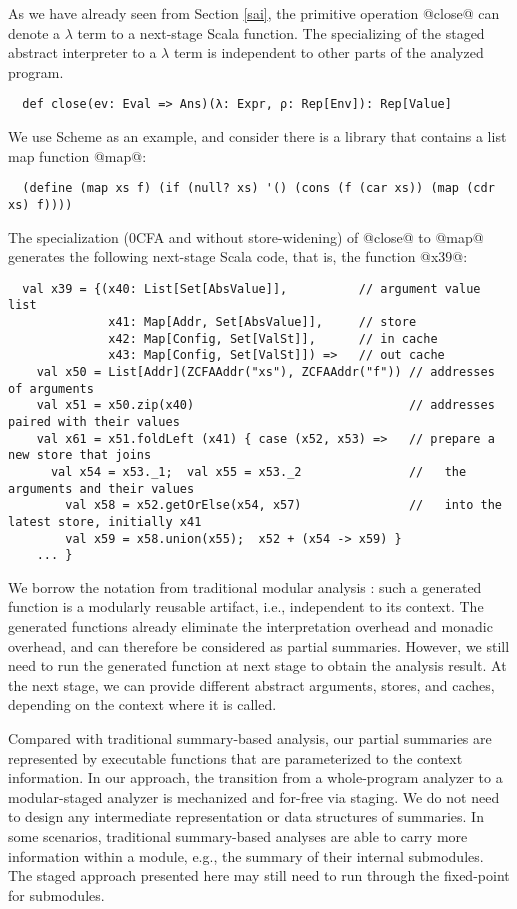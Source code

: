 As we have already seen from Section \ref{sai}, the primitive
operation @close@ can denote a $\lambda$ term to a next-stage Scala function.
The specializing of the staged abstract interpreter to a $\lambda$ term is
independent to other parts of the analyzed program.
\begin{lstlisting}
  def close(ev: Eval => Ans)(λ: Expr, ρ: Rep[Env]): Rep[Value]
\end{lstlisting}

We use Scheme as an example, and consider there is a library that contains a
list map function @map@:
\begin{lstlisting}
  (define (map xs f) (if (null? xs) '() (cons (f (car xs)) (map (cdr xs) f))))
\end{lstlisting}

The specialization (0CFA and without store-widening) of @close@ to
@map@ generates the following next-stage Scala code, that is, the
function @x39@:
\begin{lstlisting}
  val x39 = {(x40: List[Set[AbsValue]],          // argument value list
              x41: Map[Addr, Set[AbsValue]],     // store
              x42: Map[Config, Set[ValSt]],      // in cache
              x43: Map[Config, Set[ValSt]]) =>   // out cache
    val x50 = List[Addr](ZCFAAddr("xs"), ZCFAAddr("f")) // addresses of arguments
    val x51 = x50.zip(x40)                              // addresses paired with their values
    val x61 = x51.foldLeft (x41) { case (x52, x53) =>   // prepare a new store that joins
      val x54 = x53._1;  val x55 = x53._2               //   the arguments and their values
        val x58 = x52.getOrElse(x54, x57)               //   into the latest store, initially x41
        val x59 = x58.union(x55);  x52 + (x54 -> x59) }
    ... }
\end{lstlisting}

We borrow the notation from traditional modular analysis
\cite{DBLP:conf/cc/CousotC02}: such a generated function is a modularly reusable
artifact, i.e., independent to its context.
The generated functions already eliminate the interpretation overhead and
monadic overhead, and can therefore be considered as partial summaries. However, we
still need to run the generated function at next stage to obtain the analysis
result.  At the next stage, we can provide different abstract arguments, stores, and
caches, depending on the context where it is called.

Compared with traditional summary-based analysis, our partial
summaries are represented by executable functions that are
parameterized to the context information. In our approach, the
transition from a whole-program analyzer to a modular-staged analyzer is
mechanized and for-free via staging. We do not need to design any
intermediate representation or data structures of summaries.  In some
scenarios, traditional summary-based analyses are able to carry more
information within a module, e.g., the summary of their internal
submodules. The staged approach presented here may still need to run
through the fixed-point for submodules.


